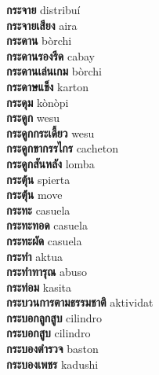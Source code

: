 \textbf{ กระจาย  } distribuí \\
\textbf{ กระจายเสียง  } aira \\
\textbf{ กระดาน  } bòrchi \\
\textbf{ กระดานรองรีด  } cabay \\
\textbf{ กระดานเล่นเกม  } bòrchi \\
\textbf{ กระดาษแข็ง  } karton \\
\textbf{ กระดุม  } kònòpi \\
\textbf{ กระดูก  } wesu \\
\textbf{ กระดูกกระเดี้ยว  } wesu \\
\textbf{ กระดูกขากรรไกร  } cacheton \\
\textbf{ กระดูกสันหลัง  } lomba \\
\textbf{ กระตุ้น  } spierta \\
\textbf{ กระตุ้่น  } move \\
\textbf{ กระทะ  } casuela \\
\textbf{ กระทะทอด  } casuela \\
\textbf{ กระทะผัด  } casuela \\
\textbf{ กระทำ  } aktua \\
\textbf{ กระทำทารุณ  } abuso \\
\textbf{ กระท่อม  } kasita \\
\textbf{ กระบวนการตามธรรมชาติ  } aktividat \\
\textbf{ กระบอกลูกสูบ  } cilindro \\
\textbf{ กระบอกสูบ  } cilindro \\
\textbf{ กระบองตำรวจ  } baston \\
\textbf{ กระบองเพชร  } kadushi \\
